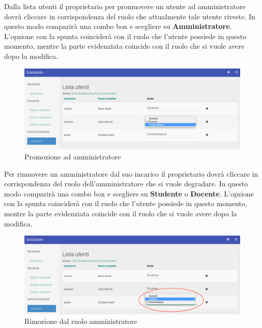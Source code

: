 \documentclass[12pt,a4paper]{article}
\begin{document}
	Dalla lista utenti il proprietario per promuovere un utente ad amministratore dovrà cliccare in corrispondenza del ruolo che attualmente tale utente riveste. In questo modo comparirà una combo box e scegliere su \textbf{Amministratore}. L'opzione con la spunta coinciderà con il ruolo che l'utente possiede in questo momento, mentre la parte evidenziata coincide con il ruolo che si vuole avere dopo la modifica.
	
		\begin{figure}[H]
			\centering
			\includegraphics[width=1\linewidth]{../img/screenshot/cambioRuoloDocAmm.png}
			\caption{Promozione ad amministratore}
			\label{Promozione ad amministratore}
		\end{figure}
	
	Per rimuovere un amministratore dal suo incarico il proprietario dovrà cliccare in corrispondenza del ruolo dell'amministratore che si vuole degradare. In questo modo comparirà una combo box e scegliere su \textbf{Studente} o \textbf{Docente}. L'opzione con la spunta coinciderà con il ruolo che l'utente possiede in questo momento, mentre la parte evidenziata coincide con il ruolo che si vuole avere dopo la modifica.
	
		\begin{figure}[H]
			\centering
			\includegraphics[width=1\linewidth]{../img/screenshot/cambioRuoloAmmDoc.png}
			\caption{Rimozione dal ruolo amministratore}
			\label{Rimozione dal ruolo amministratore}
		\end{figure}
	
\end{document}

